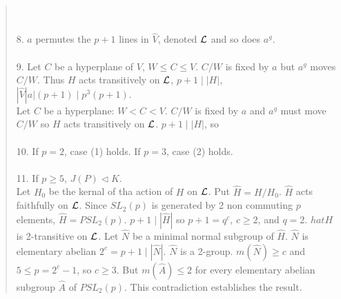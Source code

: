 \begin{quote}
\\
\\
8. $a$ permutes the $p+1$ lines in ${\hat V}$, denoted ${\cal L}$ and so does $a^g$.
\\
\\
9. Let $C$ be a hyperplane of $V$, $W \leq C \leq V$. $C/W$ is fixed by $a$ but $a^g$ moves $C/W$.  Thus $H$ acts transitively
on ${\cal L}$, $p+1 \mid |H|$, $|{\hat V} |a| (p+1) \mid p^3 (p+1)$.\\
Let $C$ be a hyperplane: $W < C < V$.  $C/W$ is fixed by $a$ and $a^g$
must move $C/W$ so $H$ acts transitively on ${\cal L}$.  $p+1 \mid |H|$, so
\\
\\
10. If $p=2$, case (1) holds.  If $p=3$, case (2) holds.
\\
\\
11. If $p\geq 5$, $J(P) \lhd K$.\\
Let $H_0$ be the kernal of tha action of $H$ on ${\cal L}$. Put ${\hat H} = H/H_0$. ${\hat H}$ acts faithfully on ${\cal L}$.
Since $SL_2(p)$ is generated by 2 non commuting $p$ elements, ${\hat H} = PSL_2(p)$.   $p+1 \mid |{\hat H}|$ so $p+1=q^c$, $c \geq 2$,
and $q=2$.
${hat H}$ is 2-transitive on ${\cal L}$.  Let ${\hat N}$ be a minimal normal subgroup of ${\hat H}$.  ${\hat N}$ is elementary
abelian $2^c=p+1 \mid |{\hat N}|$. ${\hat N}$ is a 2-group. $m({\hat N}) \geq c$ and
$5 \leq p= 2^c-1$, so $c \geq 3$.  But $m({\hat A}) \leq 2$ for every elementary abelian subgroup ${\hat A}$ of $PSL_2(p)$.  This contradiction
establishes the result.
\end{quote}
